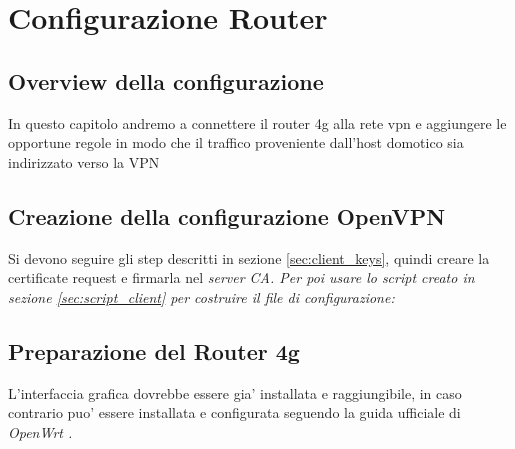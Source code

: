 
\chapter{Configurazione Router}

\section{Overview della configurazione}

In questo capitolo andremo a connettere il router 4g alla rete vpn e aggiungere le opportune regole in modo che il traffico proveniente dall'host domotico sia indirizzato verso la VPN

\section{Creazione della configurazione OpenVPN}

Si devono seguire gli step descritti in sezione \ref{sec:client_keys}, quindi creare la certificate request e firmarla nel \it{server CA}. Per poi usare lo script creato in sezione \ref{sec:script_client} per costruire il file di configurazione:



\section{Preparazione del Router 4g}

L'interfaccia grafica dovrebbe essere gia' installata e raggiungibile, in caso contrario puo' essere installata e configurata seguendo la guida ufficiale di \it{OpenWrt} \cite{install-luci}.

